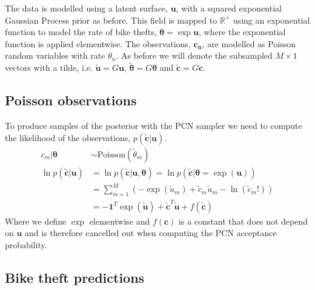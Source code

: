 \documentclass[11pt]{article}
\begin{document}
The data is modelled using a latent surface, $\boldsymbol{u}$, with a squared exponential Gaussian Process prior as before. This field is mapped to $\mathbb{R}^+$ using an exponential function to model the rate of bike thefts, $\boldsymbol{\theta} = \exp{\boldsymbol{u}}$, where the exponential function is applied elementwise. The observations, $\boldsymbol{c_n}$, are modelled as Poisson random variables with rate $\theta_n$. As before we will denote the subsampled $M\times1$ vectors with a tilde, i.e. $\tilde{\boldsymbol{u}} = G\boldsymbol{u}$, $\tilde{\boldsymbol{\theta}} = G\boldsymbol{\theta}$ and $\tilde{\boldsymbol{c}} = G\boldsymbol{c}$.
\subsection{Poisson observations}
To produce samples of the posterior with the PCN sampler we need to compute the likelihood of the observations, $p(\tilde{\boldsymbol{c}} | \boldsymbol{u})$.
\begin{equation}
    \begin{aligned}
        c_m | \boldsymbol{\theta} &\sim \text{Poisson}(\tilde{\theta}_m) \\
        \ln p(\tilde{\boldsymbol{c}} | \boldsymbol{u}) &= \ln p(\tilde{\boldsymbol{c}} | \boldsymbol{u}, \boldsymbol{\theta}) = \ln p(\tilde{\boldsymbol{c}} | \boldsymbol{\theta} = \exp(\boldsymbol{u})) \\
          &= \sum_{m=1}^{M} \left(-\exp(\tilde{u}_m) + \tilde{c}_m \tilde{u}_m - \ln(\tilde{c}_m!)\right) \\
          &= - \boldsymbol{1}^T \exp(\tilde{\boldsymbol{u}}) + \tilde{\boldsymbol{c}}^T \tilde{\boldsymbol{u}} + f(\tilde{\boldsymbol{c}})
    \end{aligned}
\end{equation}
Where we define $\exp$ elementwise and $f(\boldsymbol{c})$ is a constant that does not depend on $\boldsymbol{u}$ and is therefore cancelled out when computing the PCN acceptance probability.

\subsection{Bike theft predictions}
\end{document}
